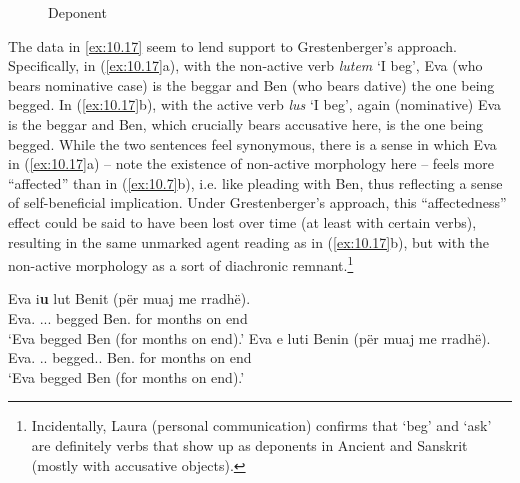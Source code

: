\documentclass[output=paper]{langsci/langscibook}
\begin{document}
\begin{figure}\footnotesize
\caption{\label{fig:fromex:10.16}Deponent}
\end{figure}

The  data in \eqref{ex:10.17} seem to lend support to Grestenberger’s
approach. Specifically, in (\ref{ex:10.17}a), with the non-active verb
\emph{lutem} ‘I beg’, Eva (who bears nominative case) is the beggar and Ben
(who bears dative) the one being begged. In (\ref{ex:10.17}b), with the active
verb \emph{lus} ‘I beg’, again (nominative) Eva is the beggar and Ben, which
crucially bears accusative here, is the one being begged. While the two
sentences feel synonymous, there is a sense in which Eva in (\ref{ex:10.17}a) --
note the existence of non-active morphology here -- feels more
\enquote{affected} than in (\ref{ex:10.7}b), i.e. like pleading with Ben,
thus reflecting a sense of self-beneficial implication. Under Grestenberger’s
approach, this \enquote{affectedness} effect could be said to have been lost
over time (at least with certain verbs), resulting in the same unmarked agent
reading as in (\ref{ex:10.17}b), but with the non-active morphology as a
sort of diachronic remnant.\footnote{Incidentally, Laura
    \citeauthor{Grestenberger2014} (personal communication) confirms that ‘beg’
    and ‘ask’ are definitely verbs that show up as deponents in Ancient 
    and Sanskrit (mostly with accusative objects).}

\ea\label{ex:10.17} 
    \ea
	\gll    Eva i\textbf{u} lut Benit (për muaj me rradhë).\\
            Eva.\Nom{}  \Cl.\Tsg.\Dat.\textbf{\Nact} begged Ben.\Dat{} \hphantom{(}for months on end\\
    \glt    `Eva begged Ben (for months on end).'
    \ex
	\gll    Eva e luti Benin (për muaj me rradhë).\\
            Eva.\Nom{}  \Cl.\Tsg.\Acc{}  begged.\Act.\Tsg{} Ben.\Acc{} \hphantom{(}for months on end\\
    \glt    `Eva begged Ben (for months on end).'
    \z
\z
\end{document}
